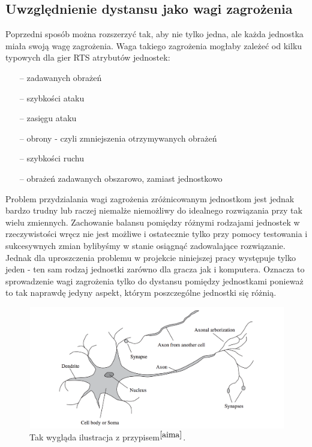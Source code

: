 \documentclass[12pt]{report}
\begin{document}
\subsection{Uwzględnienie dystansu jako wagi zagrożenia}
Poprzedni sposób można rozszerzyć tak, aby nie tylko jedna, ale każda jednostka miała swoją wagę zagrożenia. Waga takiego zagrożenia mogłaby zależeć od kilku typowych dla gier RTS atrybutów jednostek:
\begin{itemize}
\item[--] zadawanych obrażeń
\item[--] szybkości ataku
\item[--] zasięgu ataku
\item[--] obrony - czyli zmniejszenia otrzymywanych obrażeń
\item[--] szybkości ruchu
\item[--] obrażeń zadawanych obszarowo, zamiast jednostkowo
\end{itemize}
Problem przydzialania wagi zagrożenia zróżnicowanym jednostkom jest jednak bardzo trudny lub raczej niemalże niemożliwy do idealnego rozwiązania przy tak wielu zmiennych. Zachowanie balansu pomiędzy różnymi rodzajami jednostek w rzeczywistości wręcz nie jest możliwe i ostatecznie tylko przy pomocy testowania i sukcesywnych zmian bylibyśmy w stanie osiągnąć zadowalające rozwiązanie. 
Jednak dla uproszczenia problemu w projekcie niniejszej pracy występuje tylko jeden - ten sam rodzaj jednostki zarówno dla gracza jak i komputera. Oznacza to sprowadzenie wagi zagrożenia tylko do dystansu pomiędzy jednostkami ponieważ to tak naprawdę jedyny aspekt, którym poszczególne jednostki się różnią. 

\begin{figure}[h!]
\includegraphics[width=\textwidth]{neuron}
\caption{Tak wygląda ilustracja z przypisem$^{\cite{aima}}$.}
\end{figure}
\end{document}
